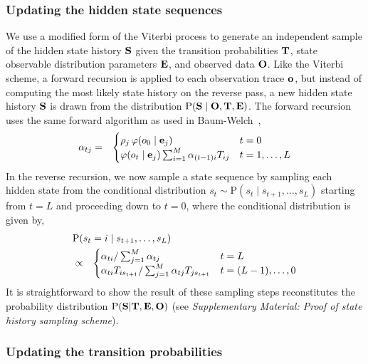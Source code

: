 \documentclass[aps,pre,twocolumn,superscriptaddress,nofootinbib,longbibliography]{revtex4-1}
\newcommand{\bfm}[1]{{\bf #1}}
\renewcommand{\Pr}{\mathrm{P}}
\begin{document}
{%
\subsubsection{Updating the hidden state sequences}

We use a modified form of the Viterbi process to generate an independent sample of the hidden state history $\bfm{S}$ given the transition probabilities $\bfm{T}$, state observable distribution parameters $\bfm{E}$, and observed data $\bfm{O}$.
Like the Viterbi scheme, a forward recursion is applied to each observation trace $\bfm{o}^{}$, but instead of computing the most likely state history on the reverse pass, a new hidden state history $\bfm{S}$ is drawn from the distribution $\Pr(\bfm{S} \mid \bfm{O}, \bfm{T}, \bfm{E})$.
The forward recursion uses the same forward algorithm as used in Baum-Welch~\cite{baum:1970:ann-math-statist:baum-welch}, 
\begin{eqnarray}
\alpha_{tj} &=& \begin{cases}
\rho_j \, \varphi(o_0 \mid \bfm{e}_j) & t = 0 \\
\varphi(o_t \mid \bfm{e}_j) \sum_{i=1}^M \alpha_{(t-1)i} T_{ij} & t = 1,\ldots,L
\end{cases}
\end{eqnarray}
In the reverse recursion, we now sample a state sequence by sampling each hidden state from the conditional distribution $s_t \sim \Pr(s_t \mid s_{t+1}, \ldots, s_L)$ starting from $t = L$ and proceeding down to $t = 0$, where the conditional distribution is given by,
\begin{eqnarray}
\lefteqn{\Pr(s_t = i \mid s_{t+1}, \ldots, s_L)} \\
&\propto& \begin{cases}
\alpha_{t i} / \sum_{j=1}^M \alpha_{t j} & t = L \\
\alpha_{t i} T_{i s_{t+1}} / \sum_{j=1}^M \alpha_{t j} T_{j s_{t+1}} & t = (L-1),\ldots,0
\end{cases} \nonumber
\end{eqnarray} 
It is straightforward to show the result of these sampling steps reconstitutes the probability distribution $\Pr(\bfm{S} | \bfm{T}, \bfm{E}, \bfm{O})$ (see \emph{Supplementary Material: Proof of state history sampling scheme}).

\subsubsection{Updating the transition probabilities}

}
\end{document}
